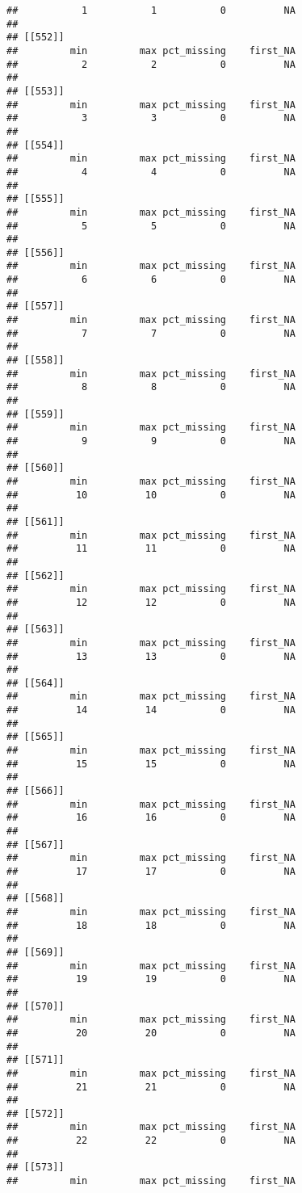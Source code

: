 \documentclass[
]{article}
\begin{document}
\begin{verbatim}
##           1           1           0          NA 
## 
## [[552]]
##         min         max pct_missing    first_NA 
##           2           2           0          NA 
## 
## [[553]]
##         min         max pct_missing    first_NA 
##           3           3           0          NA 
## 
## [[554]]
##         min         max pct_missing    first_NA 
##           4           4           0          NA 
## 
## [[555]]
##         min         max pct_missing    first_NA 
##           5           5           0          NA 
## 
## [[556]]
##         min         max pct_missing    first_NA 
##           6           6           0          NA 
## 
## [[557]]
##         min         max pct_missing    first_NA 
##           7           7           0          NA 
## 
## [[558]]
##         min         max pct_missing    first_NA 
##           8           8           0          NA 
## 
## [[559]]
##         min         max pct_missing    first_NA 
##           9           9           0          NA 
## 
## [[560]]
##         min         max pct_missing    first_NA 
##          10          10           0          NA 
## 
## [[561]]
##         min         max pct_missing    first_NA 
##          11          11           0          NA 
## 
## [[562]]
##         min         max pct_missing    first_NA 
##          12          12           0          NA 
## 
## [[563]]
##         min         max pct_missing    first_NA 
##          13          13           0          NA 
## 
## [[564]]
##         min         max pct_missing    first_NA 
##          14          14           0          NA 
## 
## [[565]]
##         min         max pct_missing    first_NA 
##          15          15           0          NA 
## 
## [[566]]
##         min         max pct_missing    first_NA 
##          16          16           0          NA 
## 
## [[567]]
##         min         max pct_missing    first_NA 
##          17          17           0          NA 
## 
## [[568]]
##         min         max pct_missing    first_NA 
##          18          18           0          NA 
## 
## [[569]]
##         min         max pct_missing    first_NA 
##          19          19           0          NA 
## 
## [[570]]
##         min         max pct_missing    first_NA 
##          20          20           0          NA 
## 
## [[571]]
##         min         max pct_missing    first_NA 
##          21          21           0          NA 
## 
## [[572]]
##         min         max pct_missing    first_NA 
##          22          22           0          NA 
## 
## [[573]]
##         min         max pct_missing    first_NA 

\end{verbatim}
\end{document}
